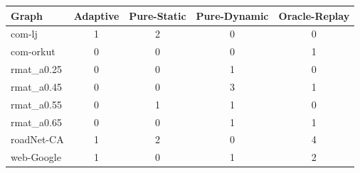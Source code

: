 \begin{tabular}{lcccc}
\hline
Graph & Adaptive & Pure-Static & Pure-Dynamic & Oracle-Replay \\
\hline
com-lj & 1 & 2 & 0 & 0 \\
com-orkut & 0 & 0 & 0 & 1 \\
rmat_a0.25 & 0 & 0 & 1 & 0 \\
rmat_a0.45 & 0 & 0 & 3 & 1 \\
rmat_a0.55 & 0 & 1 & 1 & 0 \\
rmat_a0.65 & 0 & 0 & 1 & 1 \\
roadNet-CA & 1 & 2 & 0 & 4 \\
web-Google & 1 & 0 & 1 & 2 \\
\hline
\end{tabular}
